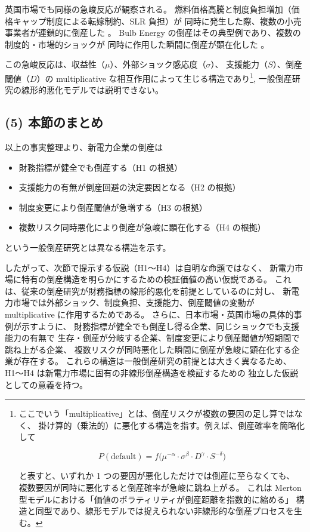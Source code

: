 英国市場でも同様の急峻反応が観察される。
燃料価格高騰と制度負担増加（価格キャップ制度による転嫁制約、SLR 負担）が
同時に発生した際、複数の小売事業者が連鎖的に倒産した
\parencite{Ofgem2021PriceCapUpdate,NAO2022SupplierFailures}。
Bulb Energy の倒産はその典型例であり、複数の制度的・市場的ショックが
同時に作用した瞬間に倒産が顕在化した
\parencite{Ofgem2021BulbSLR}。

この急峻反応は、収益性（$\mu$）、外部ショック感応度（$\sigma$）、
支援能力（$S$）、倒産閾値（$D$）の multiplicative な相互作用によって生じる構造であり\footnote{
ここでいう「multiplicative」とは、倒産リスクが複数の要因の足し算ではなく、
掛け算的（乗法的）に悪化する構造を指す。例えば、倒産確率を簡略化して


\[
P(\text{default}) = f\bigl(\mu^{-\alpha} \cdot \sigma^{\beta} \cdot D^{\gamma} \cdot S^{-\delta}\bigr)
\]


と表すと、いずれか 1 つの要因が悪化しただけでは倒産に至らなくても、
複数要因が同時に悪化すると倒産確率が急峻に跳ね上がる。
これは Merton 型モデルにおける「価値のボラティリティが倒産距離を指数的に縮める」
構造と同型であり、線形モデルでは捉えられない非線形的な倒産プロセスを生む。},
一般倒産研究の線形的悪化モデルでは説明できない。


\subsection*{(5) 本節のまとめ}

以上の事実整理より、新電力企業の倒産は
\begin{itemize}
    \item 財務指標が健全でも倒産する（H1 の根拠）
    \item 支援能力の有無が倒産回避の決定要因となる（H2 の根拠）
    \item 制度変更により倒産閾値が急増する（H3 の根拠）
    \item 複数リスク同時悪化により倒産が急峻に顕在化する（H4 の根拠）
\end{itemize}
という一般倒産研究とは異なる構造を示す。

したがって、次節で提示する仮説（H1〜H4）は自明な命題ではなく、
新電力市場に特有の倒産構造を明らかにするための検証価値の高い仮説である。
これは、従来の倒産研究が財務指標の線形的悪化を前提としているのに対し、
新電力市場では外部ショック、制度負担、支援能力、倒産閾値の変動が
multiplicative に作用するためである。
さらに、日本市場・英国市場の具体的事例が示すように、
財務指標が健全でも倒産し得る企業、同じショックでも支援能力の有無で
生存・倒産が分岐する企業、制度変更により倒産閾値が短期間で跳ね上がる企業、
複数リスクが同時悪化した瞬間に倒産が急峻に顕在化する企業が存在する。
これらの構造は一般倒産研究の前提とは大きく異なるため、
H1〜H4 は新電力市場に固有の非線形倒産構造を検証するための
独立した仮説としての意義を持つ。




